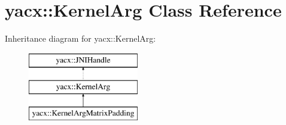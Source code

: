 \hypertarget{classyacx_1_1_kernel_arg}{}\section{yacx\+:\+:Kernel\+Arg Class Reference}
\label{classyacx_1_1_kernel_arg}
Inheritance diagram for yacx\+:\+:Kernel\+Arg\+:\begin{figure}[H]
\begin{center}
\leavevmode
\includegraphics[height=3.000000cm]{classyacx_1_1_kernel_arg}
\end{center}
\end{figure}
